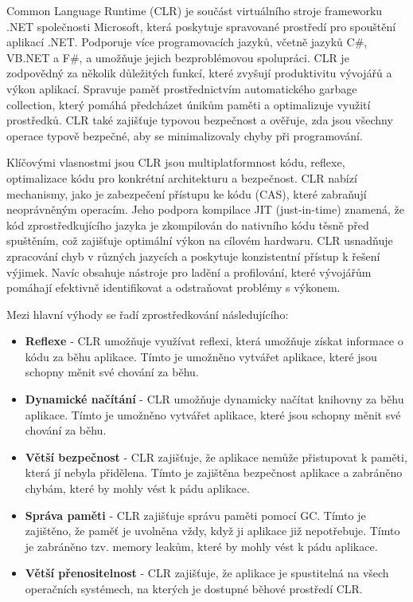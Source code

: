 Common Language Runtime (CLR) je součást virtuálního stroje frameworku .NET společnosti Microsoft, která poskytuje spravované prostředí pro spouštění aplikací .NET. Podporuje více programovacích jazyků, včetně jazyků C\#, VB.NET a F\#, a umožňuje jejich bezproblémovou spolupráci. CLR je zodpovědný za několik důležitých funkcí, které zvyšují produktivitu vývojářů a výkon aplikací. Spravuje paměť prostřednictvím automatického garbage collection, který pomáhá předcházet únikům paměti a optimalizuje využití prostředků. CLR také zajišťuje typovou bezpečnost a ověřuje, zda jsou všechny operace typově bezpečné, aby se minimalizovaly chyby při programování.

Klíčovými vlasnostmi jsou CLR jsou multiplatformnost kódu, reflexe, optimalizace kódu pro konkrétní architekturu a bezpečnost. CLR nabízí mechanismy, jako je zabezpečení přístupu ke kódu (CAS), které zabraňují neoprávněným operacím. Jeho podpora kompilace JIT (just-in-time) znamená, že kód zprostředkujícího jazyka je zkompilován do nativního kódu těsně před spuštěním, což zajišťuje optimální výkon na cílovém hardwaru. CLR usnadňuje zpracování chyb v různých jazycích a poskytuje konzistentní přístup k řešení výjimek. Navíc obsahuje nástroje pro ladění a profilování, které vývojářům pomáhají efektivně identifikovat a odstraňovat problémy s výkonem.


Mezi hlavní výhody se řadí zprostředkování následujícího:
\begin{itemize}
    \item  \textbf{Reflexe} - CLR umožňuje využívat reflexi, která umožňuje získat informace o kódu za běhu aplikace. Tímto je umožněno vytvářet aplikace, které jsou schopny měnit své chování za běhu.
    \item \textbf{Dynamické načítání} - CLR umožňuje dynamicky načítat knihovny za běhu aplikace. Tímto je umožněno vytvářet aplikace, které jsou schopny měnit své chování za běhu.
    \item \textbf{Větší bezpečnost} - CLR zajišťuje, že aplikace nemůže přistupovat k paměti, která jí nebyla přidělena. Tímto je zajištěna bezpečnost aplikace a zabráněno chybám, které by mohly vést k pádu aplikace.
    \item \textbf{Správa paměti} - CLR zajišťuje správu paměti pomocí GC. Tímto je zajištěno, že paměť je uvolněna vždy, když ji aplikace již nepotřebuje. Tímto je zabráněno tzv. memory leakům, které by mohly vést k pádu aplikace.
    \item \textbf{Větší přenositelnost} - CLR zajišťuje, že aplikace je spustitelná na všech operačních systémech, na kterých je dostupné běhové prostředí CLR.
\end{itemize}

